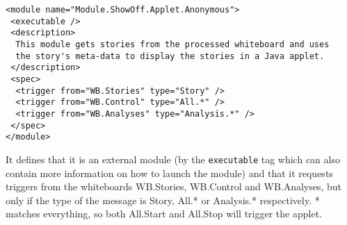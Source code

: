 \begin{verbatim}
<module name="Module.ShowOff.Applet.Anonymous">
 <executable />
 <description>
  This module gets stories from the processed whiteboard and uses 
  the story's meta-data to display the stories in a Java applet.
 </description>
 <spec>
  <trigger from="WB.Stories" type="Story" />
  <trigger from="WB.Control" type="All.*" />
  <trigger from="WB.Analyses" type="Analysis.*" />
 </spec>
</module>
\end{verbatim}

It defines that it is an external module (by the \texttt{executable} tag which
can also contain more information on how to launch the module) and that it
requests triggers from the whiteboards WB.Stories, WB.Control and WB.Analyses,
but only if the type of the message is Story, All.* or Analysis.* respectively.
* matches everything, so both All.Start and All.Stop will trigger the applet.

